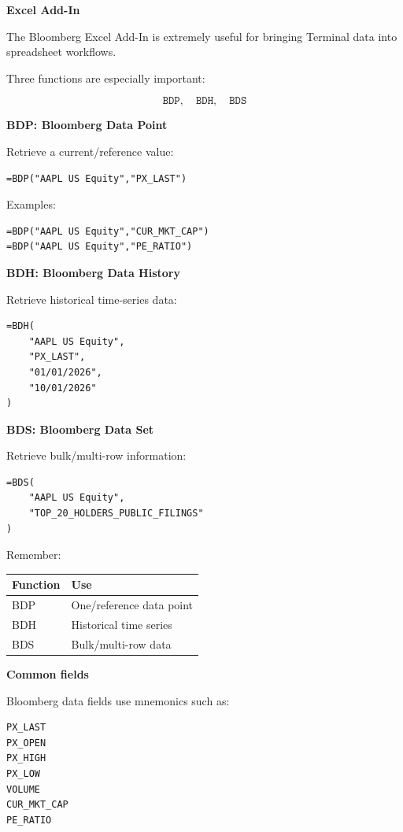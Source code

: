 \documentclass[11pt,letterpaper]{article}
\begin{document}
\textbf{Excel Add-In}

The Bloomberg Excel Add-In is extremely useful for bringing Terminal data
into spreadsheet workflows.

Three functions are especially important:

\[
\boxed{\texttt{BDP},\quad \texttt{BDH},\quad \texttt{BDS}}
\]

\textbf{BDP: Bloomberg Data Point}

Retrieve a current/reference value:

\begin{lstlisting}
=BDP("AAPL US Equity","PX_LAST")
\end{lstlisting}

Examples:

\begin{lstlisting}
=BDP("AAPL US Equity","CUR_MKT_CAP")
=BDP("AAPL US Equity","PE_RATIO")
\end{lstlisting}

\textbf{BDH: Bloomberg Data History}

Retrieve historical time-series data:

\begin{lstlisting}
=BDH(
    "AAPL US Equity",
    "PX_LAST",
    "01/01/2026",
    "10/01/2026"
)
\end{lstlisting}

\textbf{BDS: Bloomberg Data Set}

Retrieve bulk/multi-row information:

\begin{lstlisting}
=BDS(
    "AAPL US Equity",
    "TOP_20_HOLDERS_PUBLIC_FILINGS"
)
\end{lstlisting}

Remember:

\begin{center}
\begin{tabular}{ll}
\toprule
Function & Use \\
\midrule
BDP & One/reference data point \\
BDH & Historical time series \\
BDS & Bulk/multi-row data \\
\bottomrule
\end{tabular}
\end{center}

\textbf{Common fields}

Bloomberg data fields use mnemonics such as:

\begin{lstlisting}
PX_LAST
PX_OPEN
PX_HIGH
PX_LOW
VOLUME
CUR_MKT_CAP
PE_RATIO
\end{lstlisting}
\end{document}
